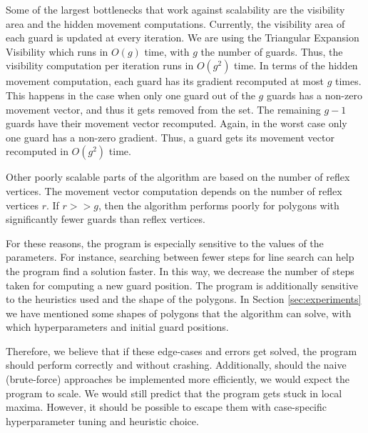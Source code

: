 Some of the largest bottlenecks that work against scalability are the visibility area and the hidden movement computations. Currently, the visibility area of each guard is updated at every iteration. We are using the Triangular Expansion Visibility \cite{DBLP:journals/corr/BungiuHHHK14} which runs in $O(g)$ time, with $g$ the number of guards. Thus, the visibility computation per iteration runs in $O(g^2)$ time. 
In terms of the hidden movement computation, each guard has its gradient recomputed at most $g$ times. This happens in the case when only one guard out of the $g$ guards has a non-zero movement vector, and thus it gets removed from the set. The remaining $g - 1$ guards have their movement vector recomputed. Again, in the worst case only one guard has a non-zero gradient. Thus, a guard gets its movement vector recomputed in $O(g^2)$ time.

\newpage
Other poorly scalable parts of the algorithm are based on the number of reflex vertices. The movement vector computation depends on the number of reflex vertices $r$. If $r >> g$, then the algorithm performs poorly for polygons with significantly fewer guards than reflex vertices.

For these reasons, the program is especially sensitive to the values of the parameters. For instance, searching between fewer steps for line search can help the program find a solution faster. In this way, we decrease the number of steps taken for computing a new guard position. 
The program is additionally sensitive to the heuristics used and the shape of the polygons. In Section \ref{sec:experiments} we have mentioned some shapes of polygons that the algorithm can solve, with which hyperparameters and initial guard positions.

Therefore, we believe that if these edge-cases and errors get solved, the program should perform correctly and without crashing. Additionally, should the naive (brute-force) approaches be implemented more efficiently, we would expect the program to scale. We would still predict that the program gets stuck in local maxima. However, it should be possible to escape them with case-specific hyperparameter tuning and heuristic choice.





